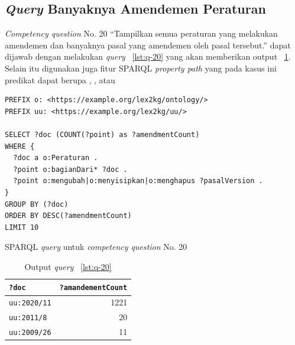 \subsection{\textit{Query} Banyaknya Amendemen Peraturan}
\label{subsec:cq20}

\textit{Competency question} No. 20 ``Tampilkan semua peraturan yang melakukan amendemen dan
banyaknya pasal yang amendemen oleh pasal tersebut.'' dapat dijawab dengan melakukan \textit{query}
\lst~\ref{lst:q-20} yang akan memberikan output \tab~\ref{tab:output-q-20}. Selain itu digunakan
juga fitur SPARQL \textit{property path} \mono{|} yang pada kasus ini predikat dapat berupa
, , atau 

\begin{listing}[H]
  \begin{verbatim}
PREFIX o: <https://example.org/lex2kg/ontology/>
PREFIX uu: <https://example.org/lex2kg/uu/>

SELECT ?doc (COUNT(?point) as ?amendmentCount)
WHERE {
  ?doc a o:Peraturan .
  ?point o:bagianDari* ?doc .
  ?point o:mengubah|o:menyisipkan|o:menghapus ?pasalVersion .
}
GROUP BY (?doc)
ORDER BY DESC(?amendmentCount)
LIMIT 10
  \end{verbatim}
  \caption{SPARQL \textit{query} untuk \textit{competency question} No. 20}
  \label{lst:q-20}
\end{listing}

\begin{table}
  \centering
  \begin{tabular}{|l|r|} \hline
    \texttt{?doc}       & \texttt{?amandementCount} \\\hline \hline
    \texttt{uu:2020/11} & 1221                      \\\hline
    \texttt{uu:2011/8}  & 20                        \\\hline
    \texttt{uu:2009/26} & 11                        \\\hline
  \end{tabular}
  \caption{Output \textit{query} \lst~\ref{lst:q-20} }
  \label{tab:output-q-20}
\end{table}

